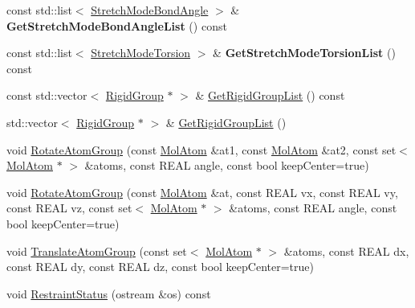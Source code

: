 \begin{DoxyCompactItemize}
const std\+::list$<$ \mbox{\hyperlink{struct_obj_cryst_1_1_stretch_mode_bond_angle}{Stretch\+Mode\+Bond\+Angle}} $>$ \& {\bfseries Get\+Stretch\+Mode\+Bond\+Angle\+List} () const
\item 
\mbox{\label{class_obj_cryst_1_1_molecule_afa3a6dfb12a7b56a0aa42d421719d0c8}} 
const std\+::list$<$ \mbox{\hyperlink{struct_obj_cryst_1_1_stretch_mode_torsion}{Stretch\+Mode\+Torsion}} $>$ \& {\bfseries Get\+Stretch\+Mode\+Torsion\+List} () const
\item 
const std\+::vector$<$ \mbox{\hyperlink{class_obj_cryst_1_1_rigid_group}{Rigid\+Group}} $\ast$ $>$ \& \mbox{\hyperlink{class_obj_cryst_1_1_molecule_a58771b4ff0139164760b7310ee2e1837}{Get\+Rigid\+Group\+List}} () const
\item 
std\+::vector$<$ \mbox{\hyperlink{class_obj_cryst_1_1_rigid_group}{Rigid\+Group}} $\ast$ $>$ \& \mbox{\hyperlink{class_obj_cryst_1_1_molecule_a62718d99f36f75a66b043b78ef4f5dbf}{Get\+Rigid\+Group\+List}} ()
\item 
void \mbox{\hyperlink{class_obj_cryst_1_1_molecule_a9bd595a0ad88d6832718f3bffb452866}{Rotate\+Atom\+Group}} (const \mbox{\hyperlink{class_obj_cryst_1_1_mol_atom}{Mol\+Atom}} \&at1, const \mbox{\hyperlink{class_obj_cryst_1_1_mol_atom}{Mol\+Atom}} \&at2, const set$<$ \mbox{\hyperlink{class_obj_cryst_1_1_mol_atom}{Mol\+Atom}} $\ast$ $>$ \&atoms, const R\+E\+AL angle, const bool keep\+Center=true)
\item 
void \mbox{\hyperlink{class_obj_cryst_1_1_molecule_a84e93db5b81b90fd5befa22caaf8691c}{Rotate\+Atom\+Group}} (const \mbox{\hyperlink{class_obj_cryst_1_1_mol_atom}{Mol\+Atom}} \&at, const R\+E\+AL vx, const R\+E\+AL vy, const R\+E\+AL vz, const set$<$ \mbox{\hyperlink{class_obj_cryst_1_1_mol_atom}{Mol\+Atom}} $\ast$ $>$ \&atoms, const R\+E\+AL angle, const bool keep\+Center=true)
\item 
void \mbox{\hyperlink{class_obj_cryst_1_1_molecule_a0d3122b53dd81aa23d2aaa2427e6291e}{Translate\+Atom\+Group}} (const set$<$ \mbox{\hyperlink{class_obj_cryst_1_1_mol_atom}{Mol\+Atom}} $\ast$ $>$ \&atoms, const R\+E\+AL dx, const R\+E\+AL dy, const R\+E\+AL dz, const bool keep\+Center=true)
\item 
\mbox{\label{class_obj_cryst_1_1_molecule_a9b7c80db4e0812b343be30aecd6785ef}} 
void \mbox{\hyperlink{class_obj_cryst_1_1_molecule_a9b7c80db4e0812b343be30aecd6785ef}{Restraint\+Status}} (ostream \&os) const

\end{DoxyCompactItemize}
